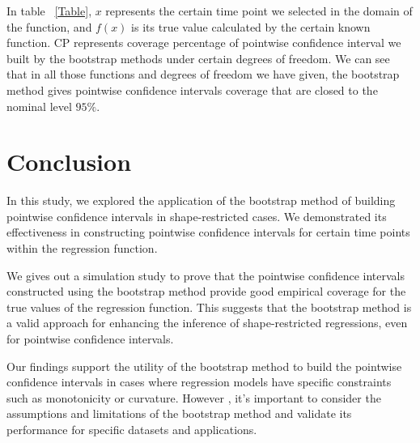 \documentclass[12pt]{article}
\begin{document}
In table ~\ref{Table}, \(x\) represents the certain time point we 
selected in the domain of the function, and \(f(x)\) is its true value
calculated by the certain known function. CP represents coverage
percentage of pointwise confidence interval we built by the bootstrap 
methods under certain degrees of freedom. We can see that in all those 
functions and degrees of freedom we have given, the bootstrap method 
gives pointwise confidence intervals coverage that are closed to the 
nominal level \(95\%\).


\section{Conclusion}
\label{Conclusion}
In this study, we explored the application of the bootstrap method of 
building pointwise confidence intervals in shape-restricted cases. 
We demonstrated its effectiveness in constructing pointwise confidence
intervals for certain time points within the regression function. 

We gives out a simulation study to prove that the pointwise confidence
intervals constructed using the bootstrap method provide good 
empirical coverage for the true values of the regression function. 
This suggests that the bootstrap method is a valid approach for 
enhancing the inference of shape-restricted regressions, even for 
pointwise confidence intervals.

Our findings support the utility of the bootstrap method to build
the pointwise confidence intervals in cases where regression models
have specific constraints such as monotonicity or curvature. However
, it's important to consider the assumptions and limitations of the
bootstrap method and validate its performance for specific datasets and applications.



\end{document}

